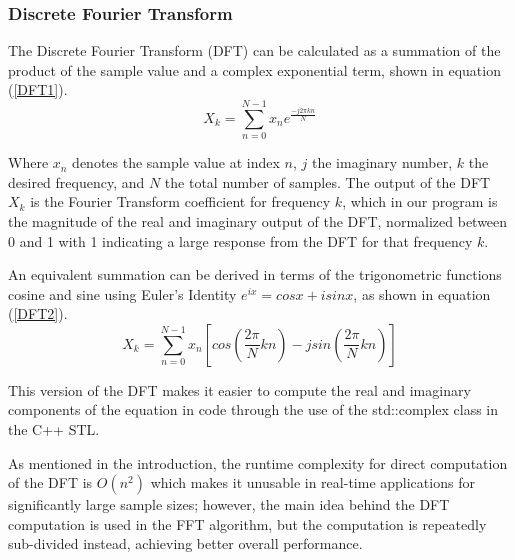 \documentclass[journal]{IEEEtran}
\begin{document}
\subsubsection{Discrete Fourier Transform}
	\par{
		The Discrete Fourier Transform (DFT) can be calculated as 
		a summation of the product of the sample value and a complex
		exponential term, shown in equation (\ref{DFT1}).
	}
		\begin{equation}\label{DFT1}
			\displaystyle X_k = 
			\sum_{n=0}^{N-1}x_ne^{\displaystyle\frac{-j2 \pi kn}{N}}
		\end{equation}
	\par{
		Where $x_n$ denotes the sample value at index $n$, $j$ the imaginary
		number, $k$ the desired frequency, and $N$ the total number of samples.
		The output of the DFT $X_k$ is the Fourier Transform coefficient for
		frequency $k$, which in our program is the magnitude of the real 
		and imaginary output of the DFT, normalized between 0 and 1 with 1
		indicating a large response from the DFT for that frequency $k$.
	}
	\par{
		An equivalent summation can be derived in terms of the trigonometric
		functions cosine and sine using Euler's Identity $e^{ix}=cosx + isinx$,
		as shown in equation (\ref{DFT2}).
	}
		\begin{equation}\label{DFT2}
			\displaystyle X_k = \sum_{n=0}^{N-1}x_n[cos(\frac{2\pi}{N}kn) 
			- jsin(\frac{2\pi}{N}kn)]
		\end{equation}

	\par{
		This version of the DFT makes it easier to compute the real and
		imaginary components of the equation in code through the use of 
		the std::complex class in the C++ STL.
	}

	\par{
		As mentioned in the introduction, the runtime complexity for direct
		computation of the DFT is $O(n^2)$ which makes it unusable in real-time
		applications for significantly large sample sizes; however, the main
		idea behind the DFT computation is used in the FFT algorithm, but the 
		computation is repeatedly sub-divided instead, 
		achieving better overall performance.
	}

\end{document}
